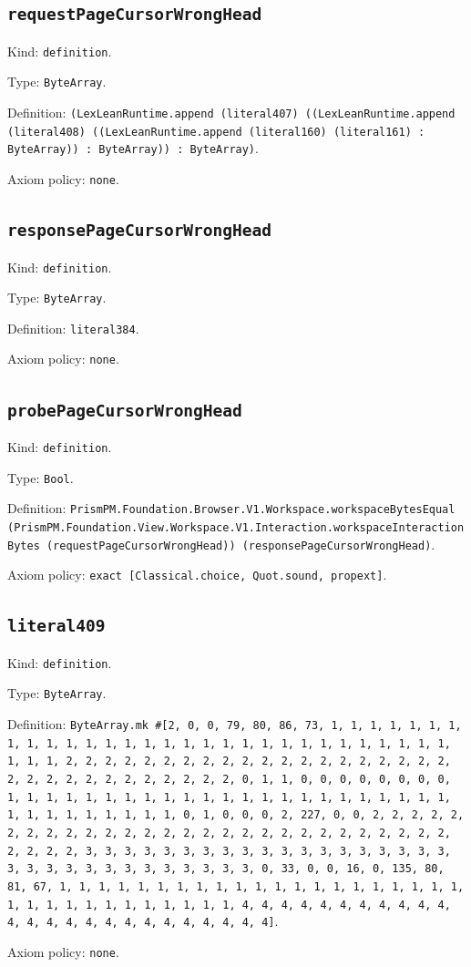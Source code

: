 \documentclass[11pt]{article}
\begin{document}
\subsection*{\texttt{requestPageCursorWrongHead}}
\noindent Kind: \texttt{definition}.\par
\noindent Type: \texttt{ByteArray}.\par
\noindent Definition: \texttt{(LexLeanRuntime.append (literal407) ((LexLeanRuntime.append (literal408) ((LexLeanRuntime.append (literal160) (literal161) : ByteArray)) : ByteArray)) : ByteArray)}.\par
\noindent Axiom policy: \texttt{none}.\par
\subsection*{\texttt{responsePageCursorWrongHead}}
\noindent Kind: \texttt{definition}.\par
\noindent Type: \texttt{ByteArray}.\par
\noindent Definition: \texttt{literal384}.\par
\noindent Axiom policy: \texttt{none}.\par
\subsection*{\texttt{probePageCursorWrongHead}}
\noindent Kind: \texttt{definition}.\par
\noindent Type: \texttt{Bool}.\par
\noindent Definition: \texttt{PrismPM.Foundation.Browser.V1.Workspace.workspaceBytesEqual (PrismPM.Foundation.View.Workspace.V1.Interaction.workspaceInteractionBytes (requestPageCursorWrongHead)) (responsePageCursorWrongHead)}.\par
\noindent Axiom policy: \texttt{exact [Classical.choice, Quot.sound, propext]}.\par
\subsection*{\texttt{literal409}}
\noindent Kind: \texttt{definition}.\par
\noindent Type: \texttt{ByteArray}.\par
\noindent Definition: \texttt{ByteArray.mk \#[2, 0, 0, 79, 80, 86, 73, 1, 1, 1, 1, 1, 1, 1, 1, 1, 1, 1, 1, 1, 1, 1, 1, 1, 1, 1, 1, 1, 1, 1, 1, 1, 1, 1, 1, 1, 1, 1, 1, 1, 2, 2, 2, 2, 2, 2, 2, 2, 2, 2, 2, 2, 2, 2, 2, 2, 2, 2, 2, 2, 2, 2, 2, 2, 2, 2, 2, 2, 2, 2, 2, 2, 0, 1, 1, 0, 0, 0, 0, 0, 0, 0, 0, 1, 1, 1, 1, 1, 1, 1, 1, 1, 1, 1, 1, 1, 1, 1, 1, 1, 1, 1, 1, 1, 1, 1, 1, 1, 1, 1, 1, 1, 1, 1, 1, 0, 1, 0, 0, 0, 2, 227, 0, 0, 2, 2, 2, 2, 2, 2, 2, 2, 2, 2, 2, 2, 2, 2, 2, 2, 2, 2, 2, 2, 2, 2, 2, 2, 2, 2, 2, 2, 2, 2, 2, 2, 3, 3, 3, 3, 3, 3, 3, 3, 3, 3, 3, 3, 3, 3, 3, 3, 3, 3, 3, 3, 3, 3, 3, 3, 3, 3, 3, 3, 3, 3, 3, 3, 0, 33, 0, 0, 16, 0, 135, 80, 81, 67, 1, 1, 1, 1, 1, 1, 1, 1, 1, 1, 1, 1, 1, 1, 1, 1, 1, 1, 1, 1, 1, 1, 1, 1, 1, 1, 1, 1, 1, 1, 1, 1, 1, 4, 4, 4, 4, 4, 4, 4, 4, 4, 4, 4, 4, 4, 4, 4, 4, 4, 4, 4, 4, 4, 4, 4, 4, 4]}.\par
\noindent Axiom policy: \texttt{none}.\par
\end{document}
